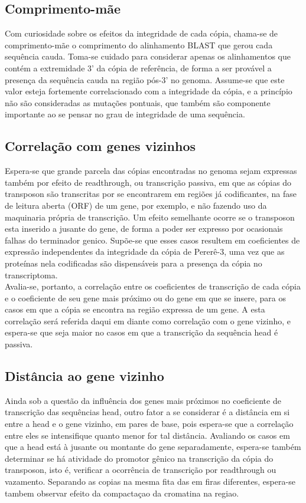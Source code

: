\documentclass{article}
\begin{document}
\begin{multicols}{2}
\subsection{Comprimento-mãe}
Com curiosidade sobre os efeitos da integridade de cada cópia, chama-se de comprimento-mãe o comprimento do alinhamento BLAST que gerou cada sequência cauda. Toma-se cuidado para considerar apenas os alinhamentos que contém a extremidade 3' da cópia de referência, de forma a ser provável a presença da sequência cauda na região pós-3' no genoma. Assume-se que este valor esteja fortemente correlacionado com a integridade da cópia, e a princípio não são consideradas as mutações pontuais, que também são componente importante ao se pensar no grau de integridade de uma sequência.

\subsection{Correlação com genes vizinhos}
Espera-se que grande parcela das cópias encontradas no genoma sejam expressas também por efeito de readthrough, ou transcrição passiva, em que as cópias do transposon são transcritas por se encontrarem em regiões já codificantes, na fase de leitura aberta (ORF) de um gene, por exemplo, e não fazendo uso da maquinaria própria de transcrição. Um efeito semelhante ocorre se o transposon esta inserido a jusante do gene, de forma a poder ser expresso por ocasionais falhas do terminador genico. Supõe-se que esses casos resultem em coeficientes de expressão independentes da integridade da cópia de Pererê-3, uma vez que as proteínas nela codificadas são dispensáveis para a presença da cópia no transcriptoma.\\

Avalia-se, portanto, a correlação entre os coeficientes de transcrição de cada cópia e o coeficiente de seu gene mais próximo ou do gene em que se insere, para os casos em que a cópia se encontra na região expressa de um gene. A esta correlação será referida daqui em diante como correlação com o gene vizinho, e espera-se que seja maior no casos em que a transcrição da sequência head é passiva.

\subsection{Distância ao gene vizinho}
Ainda sob a questão da influência dos genes mais próximos no coeficiente de transcrição das sequências head, outro fator a se considerar é a distância em si entre a head e o gene vizinho, em pares de base, pois espera-se que a correlação entre eles se intensifique quanto menor for tal distância. Avaliando os casos em que a head está à jusante ou montante do gene separadamente, espera-se também determinar se há atividade do promotor gênico na transcrição da cópia do transposon, isto é, verificar a ocorrência de transcrição por readthrough ou vazamento. Separando as copias na mesma fita das em firas diferentes, espera-se tambem observar efeito da compactaçao da cromatina na regiao.


\end{multicols}
\end{document}
